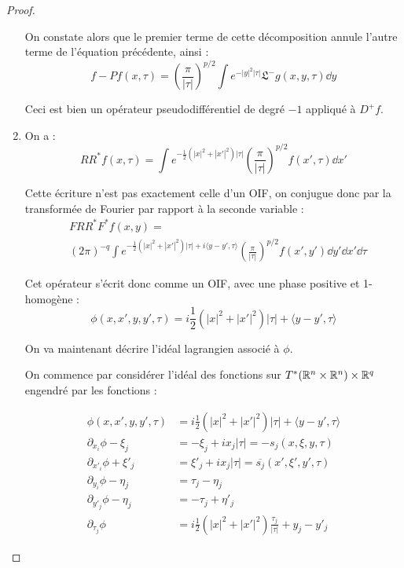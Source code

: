 \begin{proof}
\begin{enumerate}
  On constate alors que le premier terme de cette décomposition annule l'autre terme de l'équation précédente, ainsi :
  \begin{equation*}
    f-Pf(x,\tau) = \left(\frac{\pi}{|\tau|}\right)^{p/2}\int
    e^{-|y|^2|\tau|}\mathfrak{L}^- g(x,y,\tau) \dd y
  \end{equation*}
  
  Ceci est bien un opérateur pseudodifférentiel de degré $-1$ appliqué à $D^+f$.
  
  \item On a :
  \begin{equation*}
    RR^*f(x,\tau) = \int e^{-\frac 12 (|x|^2 + |x'|^2)|\tau|}
    \left(\frac{\pi}{|\tau|}\right)^{p/2} f(x',\tau)\dd x'
  \end{equation*}
  
  Cette écriture n'est pas exactement celle d'un OIF, on conjugue donc par la transformée de Fourier par rapport à la seconde variable :
  \begin{equation*}
  \begin{split}
    &FRR^*F^*f(x,y) = \\ &(2\pi)^{-q} \int e^{-\frac 12 (|x|^2 +
      |x'|^2)|\tau| + i\langle y-y', \tau \rangle}
    \left(\frac{\pi}{|\tau|}\right)^{p/2} f(x',y')\dd y'\dd x'\dd\tau
    \end{split}
  \end{equation*}
  
  Cet opérateur s'écrit donc comme un OIF, avec une phase positive et 1-homogène :
  \begin{equation*}
    \phi(x,x',y,y',\tau) = i\frac 12 (|x|^2 + |x'|^2)|\tau| + \langle y-y', \tau \rangle
  \end{equation*}
  
  On va maintenant décrire l'idéal lagrangien associé à $\phi$.
  
  On commence par considérer l'idéal des fonctions sur $T^*(\mathbb{R}^n \times \mathbb{R}^n) \times \mathbb{R}^q$ engendré par les fonctions :
  
  \begin{align*}
    \phi(x,x',y,y',\tau) &= i\frac 12 (|x|^2 + |x'|^2)|\tau| + \langle y-y', \tau \rangle\\
    \partial_{x_i}\phi - \xi_j &= -\xi_j + ix_j|\tau| = -s_j(x,\xi,y,\tau)\\
    \partial_{x'_i}\phi + \xi'_j &= \xi'_j + ix_j|\tau| = \overline{s_j}(x',\xi',y',\tau)\\
    \partial_{y_i}\phi - \eta_j &= \tau_j - \eta_j\\
    \partial_{y'_j}\phi - \eta_j &= -\tau_j + \eta'_j\\
    \partial_{\tau_j}\phi &= i \frac 12 (|x|^2 + |x'|^2)\frac{\tau_j}{|\tau|} + y_j-y'_j
  \end{align*}
  

\end{enumerate}
\end{proof}
